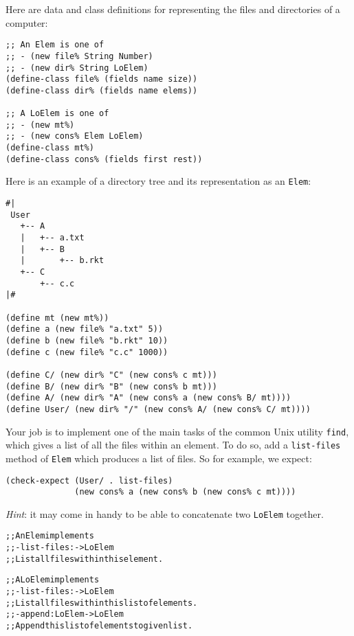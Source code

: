 \documentclass[12pt]{article}                   %
\def\pts#1{\marginpar{\footnotesize \raggedright  \fbox{#1 {\sc Points}}}}
\newenvironment{solution}{\color{red}}{}
\begin{document}
\begin{problem} \pts{15}

Here are data and class definitions for representing the files and
directories of a computer:

\begin{verbatim}
;; An Elem is one of
;; - (new file% String Number)
;; - (new dir% String LoElem)
(define-class file% (fields name size))
(define-class dir% (fields name elems))

;; A LoElem is one of
;; - (new mt%)
;; - (new cons% Elem LoElem)
(define-class mt%)
(define-class cons% (fields first rest))    
\end{verbatim}


\noindent
Here is an example of a directory tree and its representation as an
\verb|Elem|:
\begin{verbatim}
#|
 User
   +-- A
   |   +-- a.txt
   |   +-- B
   |       +-- b.rkt
   +-- C
       +-- c.c
|#

(define mt (new mt%))
(define a (new file% "a.txt" 5))
(define b (new file% "b.rkt" 10))
(define c (new file% "c.c" 1000))

(define C/ (new dir% "C" (new cons% c mt)))
(define B/ (new dir% "B" (new cons% b mt)))
(define A/ (new dir% "A" (new cons% a (new cons% B/ mt))))
(define User/ (new dir% "/" (new cons% A/ (new cons% C/ mt))))
\end{verbatim}

\newpage
\noindent
Your job is to implement one of the main tasks of the common Unix
utility \verb|find|, which gives a list of all the files within an
element.  To do so, add a \verb|list-files| method of \verb|Elem|
which produces a list of files.  So for example, we expect:
\begin{verbatim}
(check-expect (User/ . list-files) 
              (new cons% a (new cons% b (new cons% c mt))))
\end{verbatim}
\emph{Hint}: it may come in handy to be able to concatenate two
\verb|LoElem| together.

\ifrubric
\else
{}
\fi

\begin{solution}
\begin{alltt}
;; An Elem implements
;; - list-files : -> LoElem
;;   List all files within this element.

;; A LoElem implements
;; - list-files : -> LoElem
;;   List all files within this list of elements.
;; - append : LoElem -> LoElem
;;   Append this list of elements to given list.


\end{alltt}
\end{solution}
\end{problem}
\end{document}
